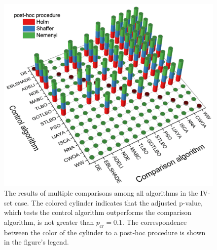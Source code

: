 \documentclass[a4paper,fleqn]{cas-dc}
\begin{document}
\begin{figure}[]
	\centering
		\includegraphics[width=1.0\columnwidth]{NNresult}
	  \caption{The results of multiple comparisons among all algorithms in the IV-set case.
               The colored cylinder indicates that the adjusted p-value,
               which tests the control algorithm outperforms the comparison algorithm,
               is not greater than $p_{cr}=0.1$.
               The correspondence between the color of the cylinder to a post-hoc procedure is shown in the figure's legend.
               }\label{figNNRezIVset}
\end{figure}
\end{document}
